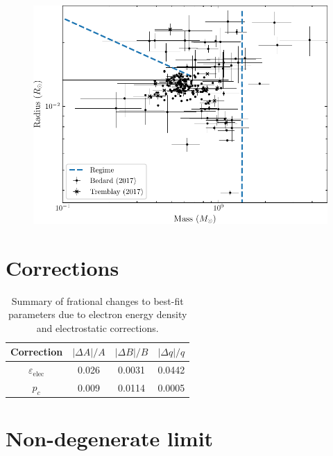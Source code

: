 \documentclass[aps,pra,10pt,twocolumn]{revtex4-2}
\begin{document}
\begin{figure}[h]
    \centering
    \includegraphics[width=\linewidth]{images/regime-model.pdf}
    \caption{}
    \label{fig:regime}
\end{figure}


\section{Corrections}

\begin{table}[ht] %
    \caption{Summary of frational changes to best-fit parameters due to electron energy density and electrostatic corrections.}
    \label{tab:corrections}
    \setlength{\tabcolsep}{12pt} %
    \renewcommand{\arraystretch}{1.5}
    \begin{tabular}{c|c|c|c} %
        \toprule
        \textbf{Correction} & $|\Delta A|/A$ & $|\Delta B|/B$ & $|\Delta q|/q$\\
        \midrule
        $\varepsilon_\mathrm{elec}$ & 0.026 & 0.0031 & 0.0442 \\
        $p_c$ & 0.009 & 0.0114 & 0.0005 \\
        \bottomrule
    \end{tabular}
\end{table}

\section{Non-degenerate limit}
\end{document}
